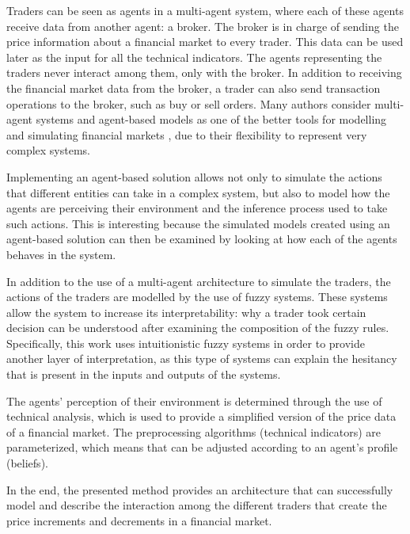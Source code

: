 Traders can be seen as agents in a multi-agent system, where each of these
agents receive data from another agent: a broker. The broker is in charge of
sending the price information about a financial market to every trader. This
data can be used later as the input for all the technical indicators. The agents
representing the traders never interact among them, only with the broker. In
addition to receiving the financial market data from the broker, a trader can
also send transaction operations to the broker, such as buy or sell orders. Many
authors consider multi-agent systems and agent-based models as one of the better
tools for modelling and simulating financial markets \cite{Lebaron2001}
\cite{Gamil2007} \cite{Boer-Sorban2008} \cite{Suarez2008} \cite{Suarez2012}, due
to their flexibility to represent very complex systems. %

Implementing an agent-based solution allows not only to simulate the actions
that different entities can take in a complex system, but also to model how the
agents are perceiving their environment and the inference process used to take
such actions. This is interesting because the simulated models created using an
agent-based solution can then be examined by looking at how each of the agents
behaves in the system.

In addition to the use of a multi-agent architecture to simulate the traders,
the actions of the traders are modelled by the use of fuzzy systems. These
systems allow the system to increase its interpretability: why a trader took
certain decision can be understood after examining the composition of the fuzzy
rules. Specifically, this work uses intuitionistic fuzzy systems in order to
provide another layer of interpretation, as this type of systems can explain the
hesitancy that is present in the inputs and outputs of the systems.

The agents' perception of their environment is determined through the use of
technical analysis, which is used to provide a simplified version of the price
data of a financial market. The preprocessing algorithms (technical indicators)
are parameterized, which means that can be adjusted according to an agent's
profile (beliefs).

In the end, the presented method provides an architecture that can successfully
model and describe the interaction among the different traders that create the
price increments and decrements in a financial market.



